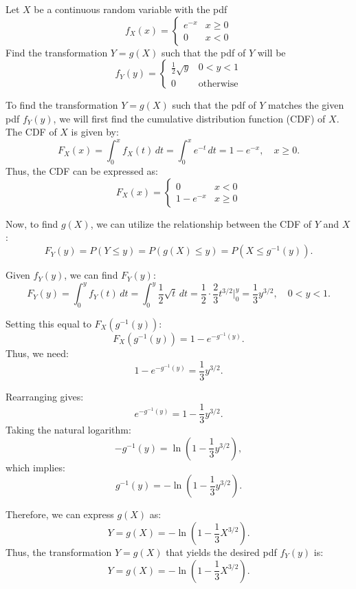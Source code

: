 \begin{exercise}
Let \( X \) be a continuous random variable with the pdf
\[
f_X(x) = 
\begin{cases} 
e^{-x} & x \geq 0 \\ 
0 & x < 0 
\end{cases}
\]
Find the transformation \( Y = g(X) \) such that the pdf of \( Y \) will be
\[
f_Y(y) = 
\begin{cases} 
\frac{1}{2} \sqrt{y} & 0 < y < 1 \\ 
0 & \text{otherwise} 
\end{cases}
\]
\end{exercise}


\begin{solution}
To find the transformation \( Y = g(X) \) such that the pdf of \( Y \) matches the given pdf \( f_Y(y) \), we will first find the cumulative distribution function (CDF) of \( X \).\\

The CDF of \( X \) is given by:
\[
F_X(x) = \int_{0}^{x} f_X(t) \, dt = \int_{0}^{x} e^{-t} \, dt = 1 - e^{-x}, \quad x \geq 0.
\]
Thus, the CDF can be expressed as:
\[
F_X(x) = 
\begin{cases} 
0 & x < 0 \\ 
1 - e^{-x} & x \geq 0 
\end{cases}
\]

Now, to find \( g(X) \), we can utilize the relationship between the CDF of \( Y \) and \( X \):
\[
F_Y(y) = P(Y \leq y) = P(g(X) \leq y) = P(X \leq g^{-1}(y)).
\]

Given \( f_Y(y) \), we can find \( F_Y(y) \):
\[
F_Y(y) = \int_{0}^{y} f_Y(t) \, dt = \int_{0}^{y} \frac{1}{2} \sqrt{t} \, dt = \frac{1}{2} \cdot \frac{2}{3} t^{3/2} \Big|_{0}^{y} = \frac{1}{3} y^{3/2}, \quad 0 < y < 1.
\]

Setting this equal to \( F_X(g^{-1}(y)) \):
\[
F_X(g^{-1}(y)) = 1 - e^{-g^{-1}(y)}.
\]
Thus, we need:
\[
1 - e^{-g^{-1}(y)} = \frac{1}{3} y^{3/2}.
\]

Rearranging gives:
\[
e^{-g^{-1}(y)} = 1 - \frac{1}{3} y^{3/2}.
\]
Taking the natural logarithm:
\[
-g^{-1}(y) = \ln\left(1 - \frac{1}{3} y^{3/2}\right),
\]
which implies:
\[
g^{-1}(y) = -\ln\left(1 - \frac{1}{3} y^{3/2}\right).
\]

Therefore, we can express \( g(X) \) as:
\[
Y = g(X) = -\ln\left(1 - \frac{1}{3} X^{3/2}\right).
\]
Thus, the transformation \( Y = g(X) \) that yields the desired pdf \( f_Y(y) \) is:
\[
Y = g(X) = -\ln\left(1 - \frac{1}{3} X^{3/2}\right).
\]
\end{solution}

